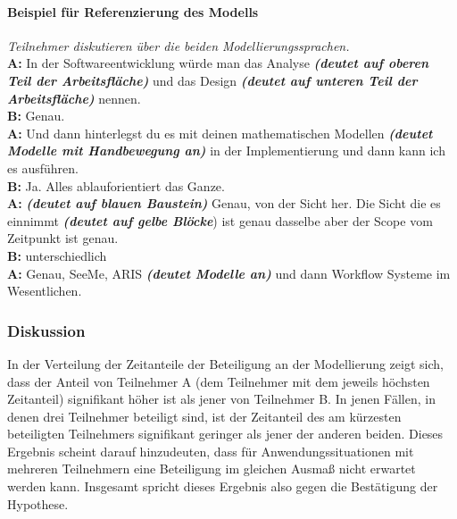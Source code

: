 \paragraph{Beispiel für Referenzierung des Modells} %
\begin{transkript}
	\emph{Teilnehmer diskutieren über die beiden Modellierungssprachen.} \\
	\textbf{A:} In der Softwareentwicklung würde man das Analyse \emph{\textbf{(deutet auf oberen Teil der Arbeitsfläche)}} und das Design \emph{\textbf{(deutet auf unteren Teil der Arbeitsfläche)}} nennen. \\
	\textbf{B:} Genau. \\
	\textbf{A:} Und dann hinterlegst du es mit deinen mathematischen Modellen \emph{\textbf{(deutet Modelle mit Handbewegung an)}} in der Implementierung und dann kann ich es ausführen. \\
	\textbf{B:} Ja. Alles ablauforientiert das Ganze. \\
	\textbf{A:} \emph{\textbf{(deutet auf blauen Baustein)}} Genau, von der Sicht her. Die Sicht die es einnimmt \emph{\textbf{(deutet auf gelbe Blöcke}}) ist genau dasselbe aber der Scope vom Zeitpunkt ist genau. \\
	\textbf{B:} unterschiedlich \\
	\textbf{A:} Genau, SeeMe, ARIS \emph{\textbf{(deutet Modelle an)}} und dann Workflow Systeme im Wesentlichen. \\
\end{transkript}

\subsubsection{Diskussion} %

In der Verteilung der Zeitanteile der Beteiligung an der Modellierung zeigt sich, dass der Anteil von Teilnehmer A (dem Teilnehmer mit dem jeweils höchsten Zeitanteil) signifikant höher ist als jener von Teilnehmer B. In jenen Fällen, in denen drei Teilnehmer beteiligt sind, ist der Zeitanteil des am kürzesten beteiligten Teilnehmers signifikant geringer als jener der anderen beiden. Dieses Ergebnis scheint darauf hinzudeuten, dass für Anwendungssituationen mit mehreren Teilnehmern eine Beteiligung im gleichen Ausmaß nicht erwartet werden kann. Insgesamt spricht dieses Ergebnis also gegen die Bestätigung der Hypothese. 

